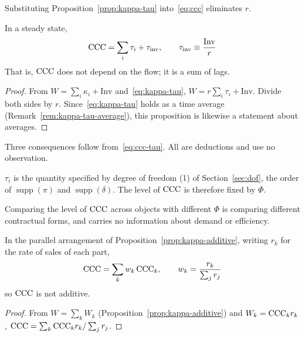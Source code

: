 Substituting Proposition~\ref{prop:kappa-tau} into~\eqref{eq:ccc} eliminates $r$.

\begin{proposition}
\label{prop:ccc-structure}
In a steady state,
\begin{equation}
\mathrm{CCC} = \sum_i \tau_i + \tau_{\mathrm{inv}},
\qquad \tau_{\mathrm{inv}} \equiv \frac{\mathrm{Inv}}{r}
\label{eq:ccc-tau}
\end{equation}
That is, $\mathrm{CCC}$ does not depend on the flow; it is a sum of lags.
\end{proposition}

\begin{proof}
From $W=\sum_i\kappa_i+\mathrm{Inv}$ and~\eqref{eq:kappa-tau},
$W = r\sum_i\tau_i + \mathrm{Inv}$. Divide both sides by $r$.
Since~\eqref{eq:kappa-tau} holds as a time average
(Remark~\ref{rem:kappa-tau-average}), this proposition is likewise a statement about
averages.
\end{proof}

Three consequences follow from~\eqref{eq:ccc-tau}. All are deductions and use no
observation.

\begin{corollary}
\label{cor:ccc-level}
$\tau_i$ is the quantity specified by degree of freedom (1) of Section~\ref{sec:dof}, the
order of $\operatorname{supp}(\pi)$ and $\operatorname{supp}(\delta)$. The level of $\mathrm{CCC}$
is therefore fixed by $\Phi$.
\end{corollary}

\begin{corollary}
\label{cor:no-cross-comparison}
Comparing the level of $\mathrm{CCC}$ across objects with different $\Phi$ is comparing different
contractual forms, and carries no information about demand or efficiency.
\end{corollary}

\begin{corollary}
\label{cor:ccc-weighted}
In the parallel arrangement of Proposition~\ref{prop:kappa-additive}, writing $r_k$ for the
rate of sales of each part,
\begin{equation}
\mathrm{CCC} = \sum_k w_k\,\mathrm{CCC}_k, \qquad w_k = \frac{r_k}{\sum_j r_j}
\label{eq:ccc-weighted}
\end{equation}
so $\mathrm{CCC}$ is not additive.
\end{corollary}

\begin{proof}
From $W=\sum_k W_k$ (Proposition~\ref{prop:kappa-additive}) and $W_k=\mathrm{CCC}_k r_k$,
$\mathrm{CCC}=\sum_k \mathrm{CCC}_k r_k/\sum_j r_j$.
\end{proof}

